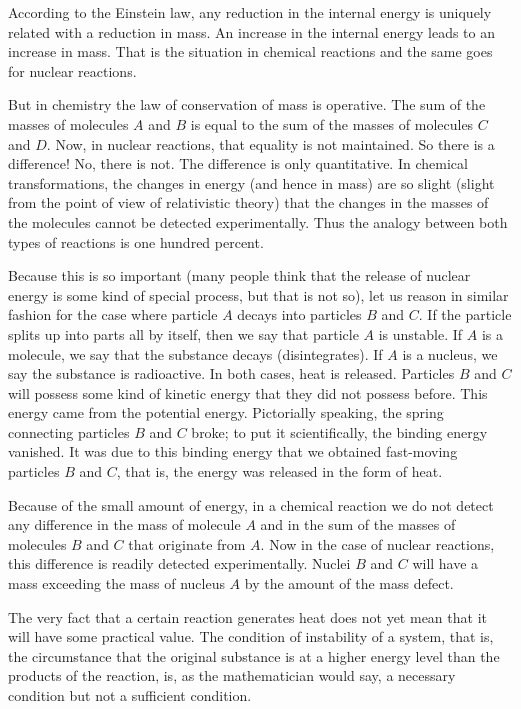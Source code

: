 According to the Einstein law, any reduction in the internal energy is uniquely related with a reduction in mass. An increase in the internal energy leads to an increase in mass. That is the situation in chemical reac­tions and the same goes for nuclear reactions.

But in chemistry the law of conservation of mass is operative. The sum of the masses of molecules $A$ and $B$ is equal to the sum of the masses of molecules $C$ and $D$. Now, in nuclear reactions, that equality is not main­tained. So there is a difference! No, there is not. The difference is only quantitative. In chemical transforma­tions, the changes in energy (and hence in mass) are so slight (slight from the point of view of relativistic theory) that the changes in the masses of the molecules cannot be detected experimentally. Thus the analogy between both types of reactions is one hundred percent.

Because this is so important (many people think that the release of nuclear energy is some kind of special process, but that is not so), let us reason in similar fash­ion for the case where particle $A$ decays into particles $B$ and $C$. If the particle splits up into parts all by itself, then we say that particle $A$ is unstable. If $A$ is a molecule, we say that the substance decays (disintegrates). If $A$ is a nucleus, we say the substance is radioactive. In both cases, heat is released. Particles $B$ and $C$ will possess some kind of kinetic energy that they did not possess before. This energy came from the potential energy. Pictorially speaking, the spring connecting particles $B$ and $C$ broke; to put it scientifically, the binding energy vanished. It was due to this binding energy that we ob­tained fast-moving particles $B$ and $C$, that is, the energy was released in the form of heat.

Because of the small amount of energy, in a chemical reaction we do not detect any difference in the mass of molecule $A$ and in the sum of the masses of molecules $B$ and $C$ that originate from $A$. Now in the case of nuclear reactions, this difference is readily detected experimen­tally. Nuclei $B$ and $C$ will have a mass exceeding the mass of nucleus $A$ by the amount of the mass defect.

The very fact that a certain reaction generates heat does not yet mean that it will have some practical value. The condition of instability of a system, that is, the circumstance that the original substance is at a higher energy level than the products of the reaction, is, as the mathematician would say, a necessary condition but not a sufficient condition.

